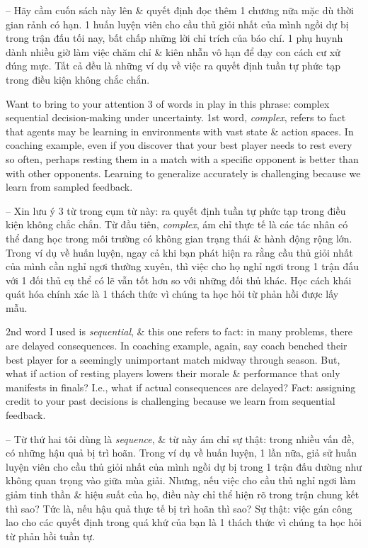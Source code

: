 \documentclass{article}
\begin{document}
\begin{itemize}
    -- Hãy cầm cuốn sách này lên \& quyết định đọc thêm 1 chương nữa mặc dù thời gian rảnh có hạn. 1 huấn luyện viên cho cầu thủ giỏi nhất của mình ngồi dự bị trong trận đấu tối nay, bất chấp những lời chỉ trích của báo chí. 1 phụ huynh dành nhiều giờ làm việc chăm chỉ \& kiên nhẫn vô hạn để dạy con cách cư xử đúng mực. Tất cả đều là những ví dụ về việc ra quyết định tuần tự phức tạp trong điều kiện không chắc chắn.

    Want to bring to your attention 3 of words in play in this phrase: complex sequential decision-making under uncertainty. 1st word, {\it complex}, refers to fact that agents may be learning in environments with vast state \& action spaces. In coaching example, even if you discover that your best player needs to rest every so often, perhaps resting them in a match with a specific opponent is better than with other opponents. Learning to generalize accurately is challenging because we learn from sampled feedback.

    -- Xin lưu ý 3 từ trong cụm từ này: ra quyết định tuần tự phức tạp trong điều kiện không chắc chắn. Từ đầu tiên, {\it complex}, ám chỉ thực tế là các tác nhân có thể đang học trong môi trường có không gian trạng thái \& hành động rộng lớn. Trong ví dụ về huấn luyện, ngay cả khi bạn phát hiện ra rằng cầu thủ giỏi nhất của mình cần nghỉ ngơi thường xuyên, thì việc cho họ nghỉ ngơi trong 1 trận đấu với 1 đối thủ cụ thể có lẽ vẫn tốt hơn so với những đối thủ khác. Học cách khái quát hóa chính xác là 1 thách thức vì chúng ta học hỏi từ phản hồi được lấy mẫu.

    2nd word I used is {\it sequential}, \& this one refers to fact: in many problems, there are delayed consequences. In coaching example, again, say coach benched their best player for a seemingly unimportant match midway through season. But, what if action of resting players lowers their morale \& performance that only manifests in finals? I.e., what if actual consequences are delayed? Fact: assigning credit to your past decisions is challenging because we learn from sequential feedback.

    -- Từ thứ hai tôi dùng là {\it sequence}, \& từ này ám chỉ sự thật: trong nhiều vấn đề, có những hậu quả bị trì hoãn. Trong ví dụ về huấn luyện, 1 lần nữa, giả sử huấn luyện viên cho cầu thủ giỏi nhất của mình ngồi dự bị trong 1 trận đấu dường như không quan trọng vào giữa mùa giải. Nhưng, nếu việc cho cầu thủ nghỉ ngơi làm giảm tinh thần \& hiệu suất của họ, điều này chỉ thể hiện rõ trong trận chung kết thì sao? Tức là, nếu hậu quả thực tế bị trì hoãn thì sao? Sự thật: việc gán công lao cho các quyết định trong quá khứ của bạn là 1 thách thức vì chúng ta học hỏi từ phản hồi tuần tự.


\end{itemize}
\end{document}
